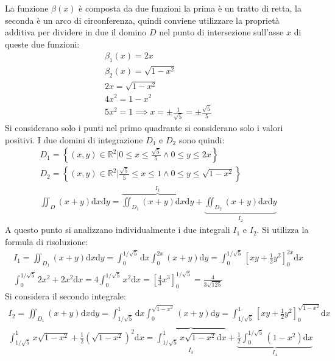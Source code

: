 \documentclass{article}
\newcommand{\df}{\mathrm{d}}
\numberwithin{equation}{subsection}
\begin{document}
La funzione $\beta(x)$ è composta da due funzioni la prima è un tratto di retta, la seconda è un arco di circonferenza, quindi conviene utilizzare la proprietà additiva per dividere in due il domino $D$ nel punto di intersezione sull'asse $x$ di queste due funzioni:
\begin{gather*}
    \beta_1(x)=2x\\
    \beta_2(x)=\sqrt{1-x^2}\\
    2x=\sqrt{1-x^2}\\
    4x^2=1-x^2\\
    5x^2=1\implies x=\pm\frac{1}{\sqrt{5}}=\pm\frac{\sqrt{5}}{5}
\end{gather*}
Si considerano solo i punti nel primo quadrante si considerano solo i valori positivi. I due domini di integrazione $D_1$ e $D_2$ sono quindi:
\begin{gather*}
    D_1=\left\{(x,y)\in\mathbb{R}^2\bigg|0\leq x\leq \frac{\sqrt{5}}{5}\land 0\leq y\leq 2x\right\}\\
    D_2=\left\{(x,y)\in\mathbb{R}^2\bigg|\frac{\sqrt{5}}{5}\leq x\leq 1\land 0\leq y\leq \sqrt{1-x^2}\right\}\\
    \iint_D(x+y)\df x \df y=\overbrace{\iint_{D_1}(x+y)\df x \df y}^{I_1}+\underbrace{\iint_{D_2}(x+y)\df x \df y}_{I_2}
\end{gather*}
A questo punto si analizzano individualmente i due integrali $I_1$ e $I_2$. Si utilizza la formula di risoluzione:
\begin{gather*}
    I_1=\iint_{D_1}(x+y)\df x \df y=\int_0^{1/\sqrt{5}}\df x\int_0^{2x}(x+y)\df y=\int_0^{1/\sqrt{5}}\left[xy+\frac{1}{2}y^2\right]_0^{2x}\df x\\
    \int_0^{1/\sqrt{5}}2x^2+2x^2\df x=4\int_0^{{1}/{\sqrt{5}}}x^2\df x=\left[\frac{4}{3}x^3\right]_0^{1/\sqrt{5}}=\frac{4}{3\sqrt{125}}
\end{gather*}
Si considera il secondo integrale:
\begin{gather*}
    I_2=\iint_{D_1}(x+y)\df x \df y=\int_{1/\sqrt{5}}^1\df x\int_0^{\sqrt{1-x^2}}(x+y)\df y=
    \int_{1/\sqrt{5}}^1\left[xy+\frac{1}{2}y^2\right]_0^{\sqrt{1-x^2}}\df x\\
    \int_{1/\sqrt{5}}^1x\sqrt{1-x^2}+\frac{1}{2}\left(\sqrt{1-x^2}\right)^2\df x=
    \overbrace{\int_{1/\sqrt{5}}^1x\sqrt{1-x^2}\df x}_{I_3}+\underbrace{\frac{1}{2}\int_0^{1/\sqrt{5}}(1-x^2)\df x}_{I_4}\\
\end{gather*}
\end{document}
